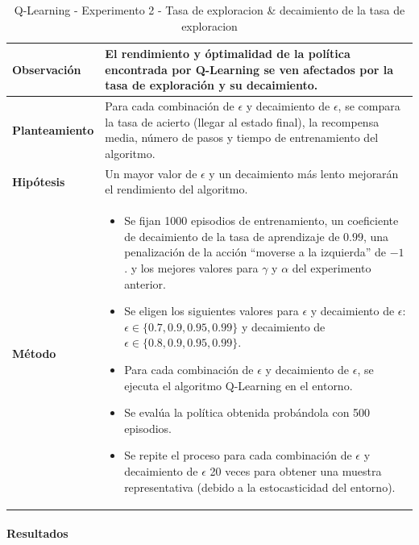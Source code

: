 \begin{table}[H]
    \centering
    \begin{tabularx}{\textwidth}{|p{4cm}|X|} %
        \hline %
        \textbf{Observación} & El rendimiento y óptimalidad de la política encontrada por Q-Learning se ven afectados por la tasa de exploración y su decaimiento. 
        \\ \hline 
        \textbf{Planteamiento} & Para cada combinación de \(\epsilon\) y decaimiento de \(\epsilon\), se compara la tasa de acierto (llegar al estado final), la recompensa media, número de pasos y tiempo de entrenamiento del algoritmo.
        \\ \hline 
        \textbf{Hipótesis} & Un mayor valor de \(\epsilon\) y un decaimiento más lento mejorarán el rendimiento del algoritmo.
        \\ \hline 
        \textbf{Método} & 
        \begin{itemize}
            \item Se fijan 1000 episodios de entrenamiento,  un coeficiente de decaimiento de la tasa de aprendizaje de $0.99$, una penalización de la acción ``moverse a la izquierda'' de $-1$. y los mejores valores para \(\gamma\) y $\alpha$ del experimento anterior.
            \item Se eligen los siguientes valores para \(\epsilon\) y decaimiento de \(\epsilon\): \(\epsilon \in \{0.7, 0.9, 0.95, 0.99\}\) y decaimiento de \(\epsilon \in \{0.8, 0.9, 0.95, 0.99\}\).
            \item Para cada combinación de \(\epsilon\) y decaimiento de \(\epsilon\), se ejecuta el algoritmo Q-Learning en el entorno.
            \item Se evalúa la política obtenida probándola con 500 episodios.
            \item Se repite el proceso para cada combinación de \(\epsilon\) y decaimiento de \(\epsilon\) 20 veces para obtener una muestra representativa (debido a la estocasticidad del entorno).
        \end{itemize}
        \\ \hline
    \end{tabularx}
    \caption{Q-Learning - Experimento 2 - Tasa de exploracion \& decaimiento de la tasa de exploracion}
    \label{tab:diseñoQLEarningExp2}
\end{table}
\newpage
\paragraph{Resultados}


